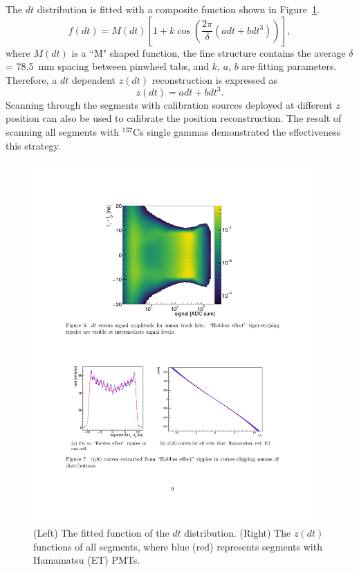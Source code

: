 The $dt$ distribution is fitted with a composite function shown in Figure~\ref{fig:TigerFit}.
\begin{equation}
f(dt) = M(dt)\left[1+k\cos(\frac{2\pi}{\delta}(a dt+b dt^3))\right],
\end{equation}
where $M(dt)$ is a ``M" shaped function, the fine structure contains the average $\delta$ = 78.5~mm  spacing between pinwheel tabs, and $k$, $a$, $b$ are fitting parameters.
Therefore, a $dt$ dependent $z(dt)$ reconstruction is expressed as
\begin{equation}
z(dt) = a dt+b dt^3.
\end{equation}
Scanning through the segments with calibration sources deployed at different $z$ position can also be used to calibrate the position reconstruction.
The result of scanning all segments with $^{137}$Cs single gammas demonstrated the effectiveness this strategy.
\begin{figure}[ht]
\centering
\includegraphics[width=0.95\textwidth]{Figures/TigerFit.pdf}
\caption[The fitted $z(dt)$ function]{
(Left) The fitted function of the $dt$ distribution.
(Right) The $z(dt)$ functions of all segments, where blue (red) represents segments with Hamamatsu (ET) PMTs.
}
\label{fig:TigerFit}
\end{figure}

